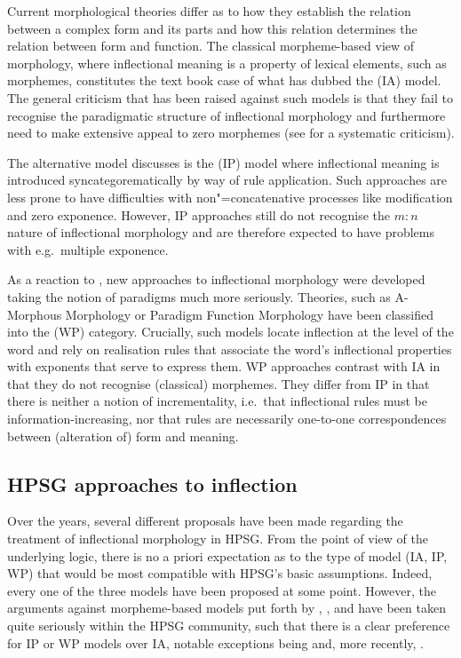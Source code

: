 \documentclass[output=paper
 	        ,biblatex
                ,babelshorthands
                ,newtxmath
                ,draftmode
                ,colorlinks, citecolor=brown
]{langscibook}
\begin{document}
Current morphological theories differ as to how they establish the
relation between a complex form and its parts and how this relation
determines the relation between form and function. The classical
morpheme-based view of morphology, where inflectional meaning is a
property of lexical elements, such as morphemes, constitutes the text
book case of what \citet{Hockett54} has dubbed the 
(IA) model.  The general criticism that has been raised against such
models is that they fail to recognise the paradigmatic structure of
inflectional morphology and furthermore need to make extensive appeal
to zero morphemes (see \citealp{Anderson92} for a systematic
criticism).

The alternative model \citet{Hockett54} discusses is the
 (IP) model where inflectional meaning is introduced
syncategorematically by way of rule application. Such approaches
are less prone to have difficulties with non"=concatenative processes
like modification and zero exponence. However, IP approaches still do
not recognise the $m:n$ nature of inflectional morphology and are
therefore expected to have problems with e.g.\ multiple exponence. 


As a reaction to \citet{Matthews72}, new approaches to inflectional
morphology were developed taking the notion of paradigms much more
seriously. Theories, such as A-Morphous Morphology \citep{Anderson92}
or Paradigm Function Morphology \citep{Stump01} have been classified
into the  (WP) category. Crucially, such models
locate inflection at the level of the word and rely on realisation
rules that associate the word's inflectional properties with exponents
that serve to express them. WP approaches contrast with IA in that
they do not recognise (classical) morphemes. They differ from IP in
that there is neither a notion of incrementality, i.e.\ that
inflectional rules must be information-increasing, nor that rules are
necessarily one-to-one correspondences between (alteration of) form
and meaning.


\subsection{HPSG approaches to inflection}
\label{sec:InflHPSG}

Over the years, several different proposals have been made regarding the
treatment of inflectional morphology in HPSG. From the point of view
of the underlying logic, there is no a priori expectation as to the type of model
(IA, IP, WP) that would be most compatible with HPSG's basic
assumptions. Indeed, every one of the three models have been proposed at
some point. However, the arguments against morpheme-based models put
forth by \citet{Matthews72}, \citet{Spencer91}, \citet{Anderson92} and
\citet{Stump01} have been taken quite seriously within the HPSG
community, such that there is a clear preference for IP or WP models over
IA, notable exceptions being \citet{van-eynde_f94} and, more
recently, \citet{Emerson15}.
\end{document}

